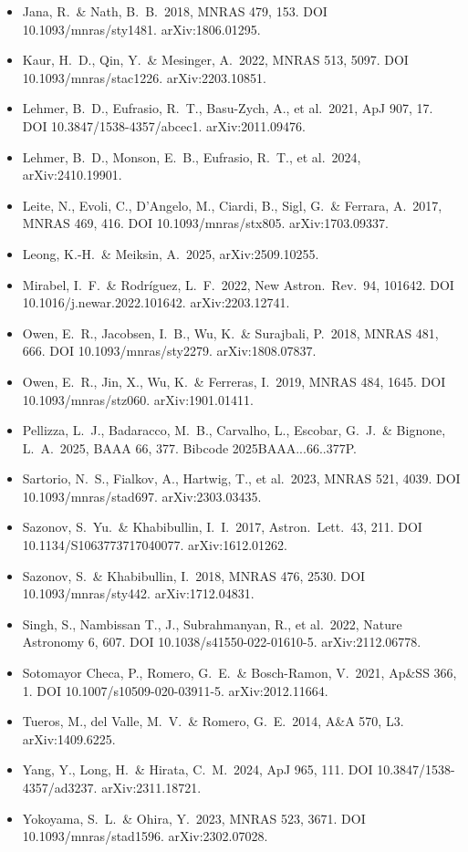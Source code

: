 \documentclass[11pt,a4paper]{article}
\begin{document}
\begin{itemize}[leftmargin=*,itemsep=1pt,label={}]
\item Jana, R.\ \& Nath, B.~B.\ 2018, MNRAS 479, 153. DOI 10.1093/mnras/sty1481. arXiv:1806.01295.
\item Kaur, H.~D., Qin, Y.\ \& Mesinger, A.\ 2022, MNRAS 513, 5097. DOI 10.1093/mnras/stac1226. arXiv:2203.10851.
\item Lehmer, B.~D., Eufrasio, R.~T., Basu-Zych, A., et al.\ 2021, ApJ 907, 17. DOI 10.3847/1538-4357/abcec1. arXiv:2011.09476.
\item Lehmer, B.~D., Monson, E.~B., Eufrasio, R.~T., et al.\ 2024, arXiv:2410.19901.
\item Leite, N., Evoli, C., D'Angelo, M., Ciardi, B., Sigl, G.\ \& Ferrara, A.\ 2017, MNRAS 469, 416. DOI 10.1093/mnras/stx805. arXiv:1703.09337.
\item Leong, K.-H.\ \& Meiksin, A.\ 2025, arXiv:2509.10255.
\item Mirabel, I.~F.\ \& Rodr\'iguez, L.~F.\ 2022, New Astron.\ Rev.\ 94, 101642. DOI 10.1016/j.newar.2022.101642. arXiv:2203.12741.
\item Owen, E.~R., Jacobsen, I.~B., Wu, K.\ \& Surajbali, P.\ 2018, MNRAS 481, 666. DOI 10.1093/mnras/sty2279. arXiv:1808.07837.
\item Owen, E.~R., Jin, X., Wu, K.\ \& Ferreras, I.\ 2019, MNRAS 484, 1645. DOI 10.1093/mnras/stz060. arXiv:1901.01411.
\item Pellizza, L.~J., Badaracco, M.~B., Carvalho, L., Escobar, G.~J.\ \& Bignone, L.~A.\ 2025, BAAA 66, 377. Bibcode 2025BAAA...66..377P.
\item Sartorio, N.~S., Fialkov, A., Hartwig, T., et al.\ 2023, MNRAS 521, 4039. DOI 10.1093/mnras/stad697. arXiv:2303.03435.
\item Sazonov, S.~Yu.\ \& Khabibullin, I.~I.\ 2017, Astron.\ Lett.\ 43, 211. DOI 10.1134/S1063773717040077. arXiv:1612.01262.
\item Sazonov, S.\ \& Khabibullin, I.\ 2018, MNRAS 476, 2530. DOI 10.1093/mnras/sty442. arXiv:1712.04831.
\item Singh, S., Nambissan T., J., Subrahmanyan, R., et al.\ 2022, Nature Astronomy 6, 607. DOI 10.1038/s41550-022-01610-5. arXiv:2112.06778.
\item Sotomayor Checa, P., Romero, G.~E.\ \& Bosch-Ramon, V.\ 2021, Ap\&SS 366, 1. DOI 10.1007/s10509-020-03911-5. arXiv:2012.11664.
\item Tueros, M., del Valle, M.~V.\ \& Romero, G.~E.\ 2014, A\&A 570, L3. arXiv:1409.6225.
\item Yang, Y., Long, H.\ \& Hirata, C.~M.\ 2024, ApJ 965, 111. DOI 10.3847/1538-4357/ad3237. arXiv:2311.18721.
\item Yokoyama, S.~L.\ \& Ohira, Y.\ 2023, MNRAS 523, 3671. DOI 10.1093/mnras/stad1596. arXiv:2302.07028.
\end{itemize}
\end{document}
